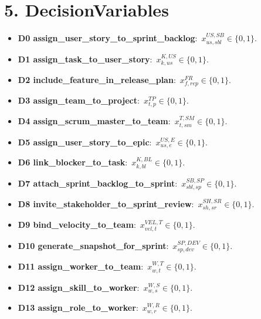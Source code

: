 \documentclass[11pt,a4paper]{article}
\begin{document}
\section{5. DecisionVariables}
\begin{itemize}
  \item \textbf{D0 assign\_user\_story\_to\_sprint\_backlog}:\ $x^{US,SB}_{us,sbl}\in\{0,1\}$.
  \item \textbf{D1 assign\_task\_to\_user\_story}:\ $x^{K,US}_{k,us}\in\{0,1\}$.
  \item \textbf{D2 include\_feature\_in\_release\_plan}:\ $x^{FR}_{f,rep}\in\{0,1\}$.
  \item \textbf{D3 assign\_team\_to\_project}:\ $x^{TP}_{t,p}\in\{0,1\}$.
  \item \textbf{D4 assign\_scrum\_master\_to\_team}:\ $x^{T,SM}_{t,sm}\in\{0,1\}$.
  \item \textbf{D5 assign\_user\_story\_to\_epic}:\ $x^{US,E}_{us,e}\in\{0,1\}$.
  \item \textbf{D6 link\_blocker\_to\_task}:\ $x^{K,BL}_{k,bl}\in\{0,1\}$.
  \item \textbf{D7 attach\_sprint\_backlog\_to\_sprint}:\ $x^{SB,SP}_{sbl,sp}\in\{0,1\}$.
  \item \textbf{D8 invite\_stakeholder\_to\_sprint\_review}:\ $x^{SH,SR}_{sh,sr}\in\{0,1\}$.
  \item \textbf{D9 bind\_velocity\_to\_team}:\ $x^{VEL,T}_{vel,t}\in\{0,1\}$.
  \item \textbf{D10 generate\_snapshot\_for\_sprint}:\ $x^{SP,DEV}_{sp,dev}\in\{0,1\}$.
  \item \textbf{D11 assign\_worker\_to\_team}:\ $x^{W,T}_{w,t}\in\{0,1\}$.
  \item \textbf{D12 assign\_skill\_to\_worker}:\ $x^{W,S}_{w,s}\in\{0,1\}$.
  \item \textbf{D13 assign\_role\_to\_worker}:\ $x^{W,R}_{w,r}\in\{0,1\}$.
\end{itemize}
\end{document}
